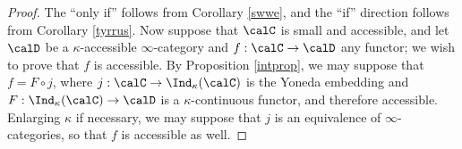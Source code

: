 \begin{proof}
The ``only if'' follows from Corollary \ref{swwe}, and the ``if'' direction follows from
Corollary \ref{tyrrus}. Now suppose that $\calC$ is small and accessible, and let
$\calD$ be a $\kappa$-accessible $\infty$-category and $f: \calC \rightarrow \calD$ any functor; we wish to prove that $f$ is accessible. By Proposition \ref{intprop}, we may suppose that
$f = F \circ j$, where $j: \calC \rightarrow \Ind_{\kappa}(\calC)$ is the Yoneda embedding
and $F: \Ind_{\kappa}(\calC) \rightarrow \calD$ is a $\kappa$-continuous functor, and therefore accessible. Enlarging $\kappa$ if necessary, we may suppose that $j$ is an equivalence of $\infty$-categories, so that $f$ is accessible as well.
\end{proof}





